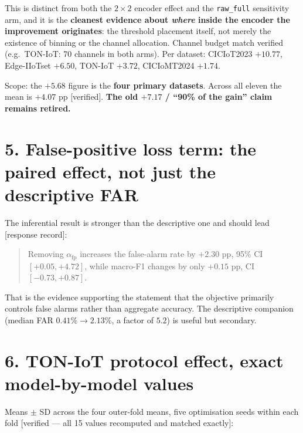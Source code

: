 \noindent This is distinct from both the $2\times2$ encoder effect and the
\texttt{raw\_full} sensitivity arm, and it is the \textbf{cleanest evidence about
\emph{where} inside the encoder the improvement originates}: the threshold placement
itself, not merely the existence of binning or the channel allocation. Channel budget
match verified (e.g.\ TON-IoT: 70 channels in both arms). Per dataset: CICIoT2023
$+10.77$, Edge-IIoTset $+6.50$, TON-IoT $+3.72$, CICIoMT2024 $+1.74$.

\noindent Scope: the $+5.68$ figure is the \textbf{four primary datasets}. Across all
eleven the mean is $+4.07$ pp \textup{[verified]}. \textbf{The old $+7.17$ / ``90\% of the
gain'' claim remains retired.}

\section*{5. False-positive loss term: the paired effect, not just the descriptive FAR}

The inferential result is stronger than the descriptive one and should lead
\textup{[response record]}:

\begin{quote}
Removing $\alpha_{\mathrm{fp}}$ increases the false-alarm rate by $\mathbf{+2.30}$ pp,
95\% CI $[+0.05, +4.72]$, while macro-F1 changes by only $+0.15$ pp,
CI $[-0.73, +0.87]$.
\end{quote}

\noindent That is the evidence supporting the statement that the objective primarily
controls false alarms rather than aggregate accuracy. The descriptive companion (median
FAR $0.41\% \rightarrow 2.13\%$, a factor of $5.2$) is useful but secondary.

\section*{6. TON-IoT protocol effect, exact model-by-model values}

Means $\pm$ SD across the four outer-fold means, five optimisation seeds within each fold
\textup{[verified --- all 15 values recomputed and matched exactly]}:

